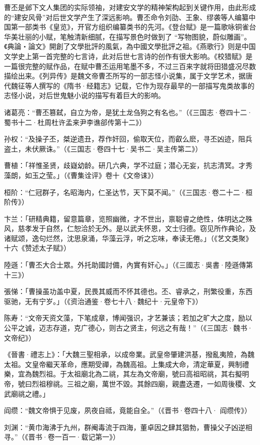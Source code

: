 曹丕是邺下文人集团的实际领袖，对建安文学的精神架构起到关键作用，由此形成的“建安风骨”对后世文学产生了深远影响。曹丕命令刘劭、王象、缪袭等人编纂中国第一部类书《皇览》，开官方组织编纂类书的先河。《登台赋》是一篇歌咏铜雀台华美壮丽的小赋，笔触清新细腻，在描写景色时做到了 “写物图貌，蔚似雕画”。《典論‧論文》開創了文學批評的風氣，為中國文學批評之祖。《燕歌行》则是中国文学史上第一首完整的七言诗，此对后世七言诗的创作有很大影响。《校猎赋》是一篇很完整的赋作品，在赋中曹丕运用笔墨不多，不过三百来字就将田猎盛况尽数描绘出来。《列异传》是魏文帝曹丕所写的一部志怪小说集，属于文学艺术，据唐代魏征等人撰写的《隋书·经籍志》记载，它作为现存最早的一部描写鬼类故事的志怪小说，对后世鬼魅小说的描写有着巨大的影响。

诸葛亮：“曹丕篡弑，自立为帝，是犹土龙刍狗之有名也。”（《三国志·卷四十二·蜀书十二·杜周杜许孟来尹李谯郤传第十二》）

孙权：“及操子丕，桀逆遗丑，荐作奸回，偷取天位，而叡么麽，寻丕凶迹，阻兵盗土，未伏厥诛。”（《三国志·卷四十七·吴书二·吴主传第二》）

曹植：「祥惟圣贤，歧嶷幼龄。研几六典，学不过庭；潜心无妄，抗志清冥。才秀藻朗，如玉之莹。」（《曹集诠评》卷十《文帝诔》）

桓阶：“仁冠群子，名昭海内，仁圣达节，天下莫不闻。”（《三国志·卷二十二·桓阶传》）

卞兰：「研精典籍，留意篇章，览照幽微，才不世出，禀聪睿之绝性，体明达之殊风，慈孝发于自然，仁恕洽於无外。是以武夫怀恩，文士归德。窃见所作典论，及诸赋颂，逸句烂然，沈思泉涌，华藻云浮，听之忘味，奉读无倦。」（《艺文类聚》十六《赞述太子赋》）

陸遜：「曹丕大合士眾。外托助國討備，內實有奸心。」（《三國志·吳書·陸遜傳第十三》）

張悌：「曹操虽功盖中夏，民畏其威而不怀其德也。丕、睿承之，刑繁役重，东西驱驰，无有宁岁。」（《资治通鉴·卷七十八·魏纪十·元皇帝下》）

陈寿：“文帝天资文藻，下笔成章，博闻强识，才艺兼该；若加之旷大之度，励以公平之诚，迈志存道，克广德心，则古之贤主，何远之有哉！”（《三国志·魏书·文帝纪》）

《晉書·禮志上》：「大魏三聖相承，以成帝業。武皇帝肇建洪基，撥亂夷險，為魏太祖。文皇帝繼天革命，應期受禪，為魏高祖。上集成大命，清定華夏，興制禮樂，宜為魏烈祖。于太祖廟北為二祧，其左為文帝廟，號曰高祖昭祧，其右擬明帝，號曰烈祖穆祧。三祖之廟，萬世不毀。其餘四廟，親盡迭遷，一如周後稷、文武廟祧之禮。」

阎缵：“魏文帝惧于见废，夙夜自祗，竟能自全。”（《晋书·卷四十八· 阎缵传》）

刘渊：“黄巾海沸于九州，群阉毒流于四海，董卓因之肆其猖勃，曹操父子凶逆相寻。”（《晋书·卷一百一·载记第一》）

